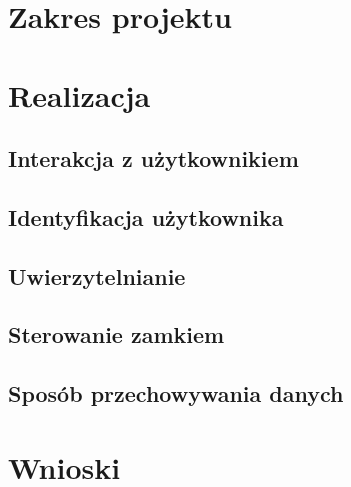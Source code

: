 \documentclass[polish,polish,a4paper]{article}
\begin{document}
	
	
	
	\section{Zakres projektu}
	
	\section{Realizacja}
	
	\subsection{Interakcja z użytkownikiem}
	
	\subsection{Identyfikacja użytkownika}
	
	\subsection{Uwierzytelnianie}
	
	\subsection{Sterowanie zamkiem}
	
	\subsection{Sposób przechowywania danych}
	
	\section{Wnioski}
	
\end{document}
